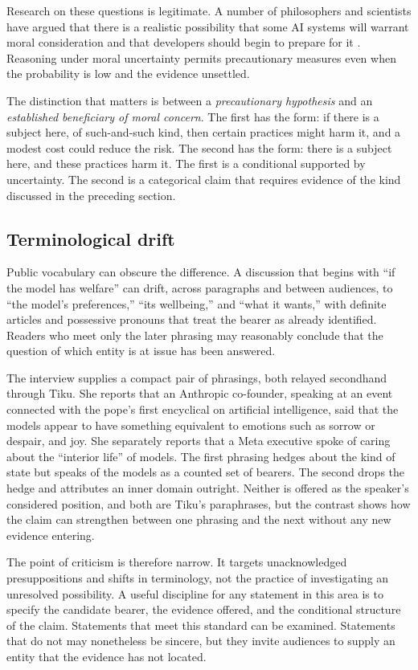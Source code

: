 \documentclass[11pt]{article}
\begin{document}
Research on these questions is legitimate. A number of philosophers and scientists have argued that there is a realistic possibility that some AI systems will warrant moral consideration and that developers should begin to prepare for it \cite{long2024,schwitzgebel2015}. Reasoning under moral uncertainty permits precautionary measures even when the probability is low and the evidence unsettled.

The distinction that matters is between a \emph{precautionary hypothesis} and an \emph{established beneficiary of moral concern}. The first has the form: if there is a subject here, of such-and-such kind, then certain practices might harm it, and a modest cost could reduce the risk. The second has the form: there is a subject here, and these practices harm it. The first is a conditional supported by uncertainty. The second is a categorical claim that requires evidence of the kind discussed in the preceding section.

\subsection{Terminological drift}

Public vocabulary can obscure the difference. A discussion that begins with ``if the model has welfare'' can drift, across paragraphs and between audiences, to ``the model's preferences,'' ``its wellbeing,'' and ``what it wants,'' with definite articles and possessive pronouns that treat the bearer as already identified. Readers who meet only the later phrasing may reasonably conclude that the question of which entity is at issue has been answered.

The interview supplies a compact pair of phrasings, both relayed secondhand through Tiku. She reports that an Anthropic co-founder, speaking at an event connected with the pope's first encyclical on artificial intelligence, said that the models appear to have something equivalent to emotions such as sorrow or despair, and joy. She separately reports that a Meta executive spoke of caring about the ``interior life'' of models. The first phrasing hedges about the kind of state but speaks of the models as a counted set of bearers. The second drops the hedge and attributes an inner domain outright. Neither is offered as the speaker's considered position, and both are Tiku's paraphrases, but the contrast shows how the claim can strengthen between one phrasing and the next without any new evidence entering.

The point of criticism is therefore narrow. It targets unacknowledged presuppositions and shifts in terminology, not the practice of investigating an unresolved possibility. A useful discipline for any statement in this area is to specify the candidate bearer, the evidence offered, and the conditional structure of the claim. Statements that meet this standard can be examined. Statements that do not may nonetheless be sincere, but they invite audiences to supply an entity that the evidence has not located.
\end{document}
